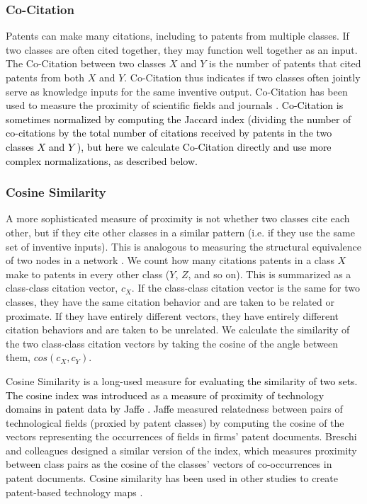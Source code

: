 \documentclass[]{svjour3}
\begin{document}
\subsubsection{Co-Citation}
Patents can make many citations, including to patents from multiple classes. If two classes are often cited together, they may function well together as an input. The Co-Citation between two classes $X$ and $Y$ is the number of patents that cited patents from both $X$ and $Y$. Co-Citation thus indicates if two classes often jointly serve as knowledge inputs for the same inventive output. Co-Citation has been used to measure the proximity of scientific fields and journals \citep{Uzzi2013, Wallace2009}. \textcolor{black}{Co-Citation is sometimes normalized by computing the Jaccard index (dividing the number of co-citations by the total number of citations received by patents in the two classes $X$ and $Y$ \citep{SmallHenry1973}), but here we calculate Co-Citation directly and use more complex normalizations, as described below.}

\subsubsection{Cosine Similarity}
A more sophisticated measure of proximity is not whether two classes cite each other, but if they cite other classes in a similar pattern (i.e. if they use the same set of inventive inputs). This is analogous to measuring the structural equivalence of two nodes in a network \citep{Leicht2006}. We count how many citations patents in a class $X$ make to patents in every other class ($Y$, $Z$, and so on). This is summarized as a class-class citation vector, $c_X$. If the class-class citation vector is the same for two classes, they have the same citation behavior and are taken to be related or proximate. If they have entirely different vectors, they have entirely different citation behaviors and are taken to be unrelated. We calculate the similarity of the two class-class citation vectors by taking the cosine of the angle between them, $cos(c_X, c_Y)$. 

Cosine Similarity is a long-used measure \textcolor{black}{for evaluating the similarity of two sets. The cosine index was introduced as a measure of proximity of technology domains in patent data by Jaffe \citep{Jaffe1986, Jaffe1989}. Jaffe} measured relatedness between pairs of technological fields (proxied by patent classes) by computing the cosine of the vectors representing the occurrences of fields in firms' patent documents. Breschi and colleagues \citep{Breschi2003} designed a similar version of the index, which measures proximity between class pairs as the cosine of the classes' vectors of co-occurrences in patent documents. Cosine similarity has been used in other studies to create patent-based technology maps \citep{Kay2014, Leydesdorff2014}.
\end{document}
